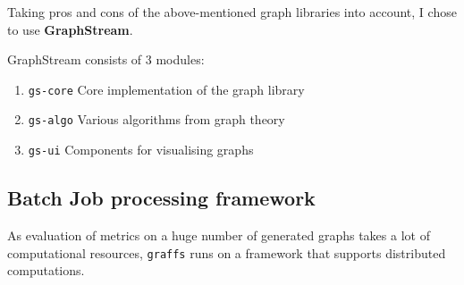 Taking pros and cons of the above-mentioned graph libraries into account, I chose to use \textbf{GraphStream}.

GraphStream consists of 3 modules:

\begin{enumerate}
    \item \texttt{gs-core} Core implementation of the graph library
    \item \texttt{gs-algo} Various algorithms from graph theory
    \item \texttt{gs-ui} Components for visualising graphs
\end{enumerate}

\subsection{Batch Job processing framework}

As evaluation of metrics on a huge number of generated graphs takes a lot of computational resources, \texttt{graffs} runs on a framework that supports distributed computations.

